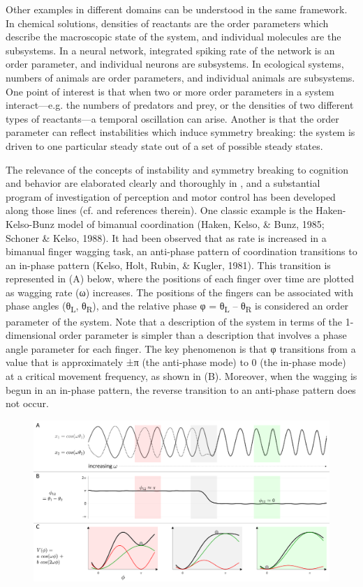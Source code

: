   Other examples in different domains can be understood in the same framework. In chemical solutions, densities of reactants are the order parameters which describe the macroscopic state of the system, and individual molecules are the subsystems. In a neural network, integrated spiking rate of the network is an order parameter, and individual neurons are subsystems. In ecological systems, numbers of animals are order parameters, and individual animals are subsystems. One point of interest is that when two or more order parameters in a system interact—e.g. the numbers of predators and prey, or the densities of two different types of reactants—a temporal oscillation can arise. Another is that the order parameter can reflect instabilities which induce symmetry breaking: the system is driven to one particular steady state out of a set of possible steady states. 

The relevance of the concepts of instability and symmetry breaking to cognition and behavior are elaborated clearly and thoroughly in \citet{Kelso1997}, and a substantial program of investigation of perception and motor control has been developed along those lines (cf. \citet{Kelso1997} and references therein). One classic example is the Haken-Kelso-Bunz model of bimanual coordination (Haken, Kelso, \& Bunz, 1985; Schoner \& Kelso, 1988). It had been observed that as rate is increased in a bimanual finger wagging task, an anti-phase pattern of coordination transitions to an in-phase pattern (Kelso, Holt, Rubin, \& Kugler, 1981). This transition is represented in (A) below, where the positions of each finger over time are plotted as wagging rate (ω) increases. The positions of the fingers can be associated with phase angles (θ\textsubscript{L}, θ\textsubscript{R}), and the relative phase φ = θ\textsubscript{L} – θ\textsubscript{R} is considered an order parameter of the system. Note that a description of the system in terms of the 1-dimensional order parameter is simpler than a description that involves a phase angle parameter for each finger. The key phenomenon is that φ transitions from a value that is approximately ±π (the anti-phase mode) to 0 (the in-phase mode) at a critical movement frequency, as shown in (B). Moreover, when the wagging is begun in an in-phase pattern, the reverse transition to an anti-phase pattern does not occur.

  
\begin{figure}
\includegraphics[width=\textwidth]{figures/Tilsen-img167.png}
\caption{\missingcaption}
\label{fig:}
\end{figure}
 

